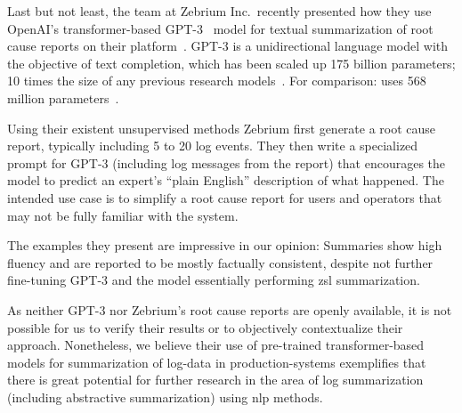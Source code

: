 Last but not least, the team at Zebrium Inc.\ recently presented how they use OpenAI's transformer-based GPT-3~\parencite{gpt3} model
for textual summarization of root cause reports on their platform~\parencite{zebrium_log_summary}.
GPT-3 is a unidirectional language model with the objective of text completion,
which has been scaled up 175 billion parameters; 10 times the size of any previous research models~\parencite{gpt3}.
For comparison:  uses 568 million parameters~\parencite[11329]{pegasus}.

Using their existent unsupervised methods Zebrium first generate a root cause report,
typically including 5 to 20 log events.
They then write a specialized prompt for GPT-3 (including log messages from the report) that encourages
the model to predict an expert's \enquote{plain English} description of what happened.
The intended use case is to simplify a root cause report for users and operators that may not be fully familiar with the system.

The examples they present are impressive in our opinion:
Summaries show high fluency and are reported to be mostly factually consistent,
despite not further fine-tuning GPT-3 and the model essentially performing \acl{zsl} summarization.

As neither GPT-3 nor Zebrium's root cause reports are openly available,
it is not possible for us to verify their results or to objectively contextualize their approach.
Nonetheless, we believe their use of pre-trained transformer-based models for summarization of log-data in production-systems
exemplifies that there is great potential for further research in the area of log summarization (including abstractive summarization) using \ac{nlp} methods.
